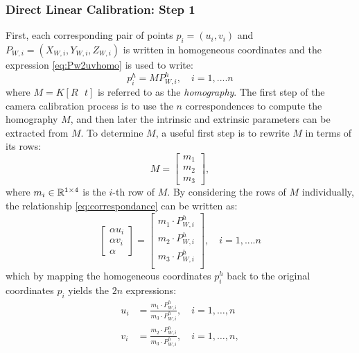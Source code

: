 \subsubsection{Direct Linear Calibration: Step 1}
First, each corresponding pair of points $p_i = (u_i,v_i)$ and $P_{W,i} = (X_{W,i}, Y_{W,i}, Z_{W,i})$ is written in homogeneous coordinates and the expression \eqref{eq:Pw2uvhomo} is used to write:
\begin{equation} \label{eq:correspondance}
    p_i^h = M P_{W,i}^h, \quad i = 1,....n
\end{equation}
where $M = K[R \:\:\: t]$ is referred to as the \textit{homography}. The first step of the camera calibration process is to use the $n$ correspondences to compute the homography $M$, and then later the intrinsic and extrinsic parameters can be extracted from $M$. To determine $M$, a useful first step is to rewrite $M$ in terms of its rows:
\begin{equation}
    M = \begin{bmatrix}
        m_1 \\ m_2 \\ m_3
    \end{bmatrix},
\end{equation}
where $m_i \in \mathbb{R}^{1 \times 4}$ is the $i$-th row of $M$. By considering the rows of $M$ individually, the relationship \eqref{eq:correspondance} can be written as:
\begin{equation*}
    \begin{bmatrix}
        \alpha u_i \\ \alpha v_i \\ \alpha
    \end{bmatrix} = \begin{bmatrix}
         m_1 \cdot P_{W,i}^h \\ m_2 \cdot P_{W,i}^h \\ m_3 \cdot P_{W,i}^h \\
    \end{bmatrix}, \quad i = 1,....n
\end{equation*}
which by mapping the homogeneous coordinates $p_i^h$ back to the original coordinates $p_i$ yields the $2n$ expressions:
\begin{equation*}
\begin{split}
    u_i &= \frac{m_1 \cdot P_{W,i}^h}{m_3 \cdot P_{W,i}^h}, \quad i = 1,\dots,n \\
    v_i &= \frac{m_2 \cdot P_{W,i}^h}{m_3 \cdot P_{W,i}^h}, \quad i = 1,\dots,n,
\end{split}
\end{equation*}
